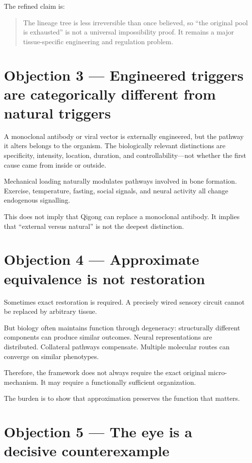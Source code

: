 The refined claim is:

\begin{quote}
The lineage tree is less irreversible than once believed, so ``the original pool is exhausted'' is not a universal impossibility proof. It remains a major tissue-specific engineering and regulation problem.
\end{quote}

\section{Objection 3 --- Engineered triggers are categorically different from natural triggers}

A monoclonal antibody or viral vector is externally engineered, but the pathway it alters belongs to the organism. The biologically relevant distinctions are specificity, intensity, location, duration, and controllability---not whether the first cause came from inside or outside.

Mechanical loading naturally modulates pathways involved in bone formation. Exercise, temperature, fasting, social signals, and neural activity all change endogenous signalling.

This does not imply that Qigong can replace a monoclonal antibody. It implies that ``external versus natural'' is not the deepest distinction.

\section{Objection 4 --- Approximate equivalence is not restoration}

Sometimes exact restoration is required. A precisely wired sensory circuit cannot be replaced by arbitrary tissue.

But biology often maintains function through degeneracy: structurally different components can produce similar outcomes. Neural representations are distributed. Collateral pathways compensate. Multiple molecular routes can converge on similar phenotypes.

Therefore, the framework does not always require the exact original micro-mechanism. It may require a functionally sufficient organization.

The burden is to show that approximation preserves the function that matters.

\section{Objection 5 --- The eye is a decisive counterexample}

